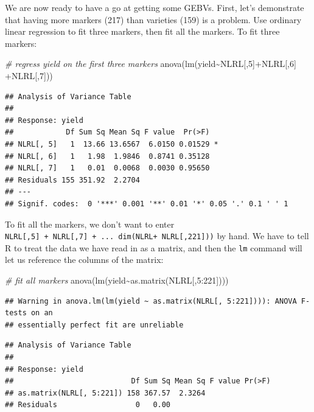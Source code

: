 \documentclass[
]{book}
\newenvironment{Shaded}{\begin{snugshade}}{\end{snugshade}}
\newcommand{\CommentTok}[1]{\textcolor[rgb]{0.56,0.35,0.01}{\textit{#1}}}
\newcommand{\DecValTok}[1]{\textcolor[rgb]{0.00,0.00,0.81}{#1}}
\newcommand{\FunctionTok}[1]{\textcolor[rgb]{0.00,0.00,0.00}{#1}}
\newcommand{\NormalTok}[1]{#1}
\newcommand{\SpecialCharTok}[1]{\textcolor[rgb]{0.00,0.00,0.00}{#1}}
\begin{document}
We are now ready to have a go at getting some GEBVs. First, let's demonstrate that having
more markers (217) than varieties (159) is a problem. Use ordinary linear regression to fit
three markers, then fit all the markers. To fit three markers:

\begin{Shaded}
\begin{Highlighting}[]
\CommentTok{\# regress yield on the first three markers}
\FunctionTok{anova}\NormalTok{(}\FunctionTok{lm}\NormalTok{(yield}\SpecialCharTok{\textasciitilde{}}\NormalTok{NLRL[,}\DecValTok{5}\NormalTok{]}\SpecialCharTok{+}\NormalTok{NLRL[,}\DecValTok{6}\NormalTok{] }\SpecialCharTok{+}\NormalTok{NLRL[,}\DecValTok{7}\NormalTok{]))}
\end{Highlighting}
\end{Shaded}

\begin{verbatim}
## Analysis of Variance Table
## 
## Response: yield
##            Df Sum Sq Mean Sq F value  Pr(>F)  
## NLRL[, 5]   1  13.66 13.6567  6.0150 0.01529 *
## NLRL[, 6]   1   1.98  1.9846  0.8741 0.35128  
## NLRL[, 7]   1   0.01  0.0068  0.0030 0.95650  
## Residuals 155 351.92  2.2704                  
## ---
## Signif. codes:  0 '***' 0.001 '**' 0.01 '*' 0.05 '.' 0.1 ' ' 1
\end{verbatim}

To fit all the markers, we don't want to enter \texttt{NLRL{[},5{]}\ +\ NLRL{[},7{]}\ +\ ...\ dim(NLRL+\ NLRL{[},221{]}))} by hand. We have to tell R to treat the data we have read in as a matrix, and then the \texttt{lm} command will let us reference the columns of the matrix:

\begin{Shaded}
\begin{Highlighting}[]
\CommentTok{\# fit all markers}
\FunctionTok{anova}\NormalTok{(}\FunctionTok{lm}\NormalTok{(yield}\SpecialCharTok{\textasciitilde{}}\FunctionTok{as.matrix}\NormalTok{(NLRL[,}\DecValTok{5}\SpecialCharTok{:}\DecValTok{221}\NormalTok{])))}
\end{Highlighting}
\end{Shaded}

\begin{verbatim}
## Warning in anova.lm(lm(yield ~ as.matrix(NLRL[, 5:221]))): ANOVA F-tests on an
## essentially perfect fit are unreliable
\end{verbatim}

\begin{verbatim}
## Analysis of Variance Table
## 
## Response: yield
##                           Df Sum Sq Mean Sq F value Pr(>F)
## as.matrix(NLRL[, 5:221]) 158 367.57  2.3264               
## Residuals                  0   0.00
\end{verbatim}
\end{document}
